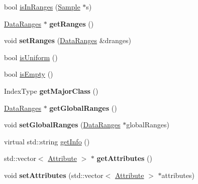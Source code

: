 \begin{DoxyCompactItemize}
\item 
bool \hyperlink{classffactory_1_1_partition_statistics_abfc82c4f58a2aac9e1e973f523eb518f}{is\-In\-Ranges} (\hyperlink{classffactory_1_1_sample}{Sample} $\ast$s)
\item 
\hypertarget{classffactory_1_1_partition_statistics_a6a55fa5cd07f699548228fa2fc8e4145}{\hyperlink{classffactory_1_1_data_ranges}{Data\-Ranges} $\ast$ {\bfseries get\-Ranges} ()}\label{classffactory_1_1_partition_statistics_a6a55fa5cd07f699548228fa2fc8e4145}

\item 
\hypertarget{classffactory_1_1_partition_statistics_ade813f7891be11a26099ee3a3f43226c}{void {\bfseries set\-Ranges} (\hyperlink{classffactory_1_1_data_ranges}{Data\-Ranges} \&dranges)}\label{classffactory_1_1_partition_statistics_ade813f7891be11a26099ee3a3f43226c}

\item 
bool \hyperlink{classffactory_1_1_partition_statistics_aa927287d8be8aff9837578c5a06c770b}{is\-Uniform} ()
\item 
bool \hyperlink{classffactory_1_1_partition_statistics_a4ec7df5caa2f742cde745d89aa8ccec6}{is\-Empty} ()
\item 
\hypertarget{classffactory_1_1_partition_statistics_a96e49d994399370182a3482183466a1f}{Index\-Type {\bfseries get\-Major\-Class} ()}\label{classffactory_1_1_partition_statistics_a96e49d994399370182a3482183466a1f}

\item 
\hypertarget{classffactory_1_1_partition_statistics_a8b6fdc3ff4f64114922278ac8db8da39}{\hyperlink{classffactory_1_1_data_ranges}{Data\-Ranges} $\ast$ {\bfseries get\-Global\-Ranges} ()}\label{classffactory_1_1_partition_statistics_a8b6fdc3ff4f64114922278ac8db8da39}

\item 
\hypertarget{classffactory_1_1_partition_statistics_a9d1f36a35f75db82e26043569e47b8e9}{void {\bfseries set\-Global\-Ranges} (\hyperlink{classffactory_1_1_data_ranges}{Data\-Ranges} $\ast$global\-Ranges)}\label{classffactory_1_1_partition_statistics_a9d1f36a35f75db82e26043569e47b8e9}

\item 
virtual std\-::string \hyperlink{classffactory_1_1_partition_statistics_a9a398b8dce4258794ebba89ef78f1978}{get\-Info} ()
\item 
\hypertarget{classffactory_1_1_partition_statistics_a74a0483397cf04ede026c060e84dd32c}{std\-::vector$<$ \hyperlink{classffactory_1_1_attribute}{Attribute} $>$ $\ast$ {\bfseries get\-Attributes} ()}\label{classffactory_1_1_partition_statistics_a74a0483397cf04ede026c060e84dd32c}

\item 
\hypertarget{classffactory_1_1_partition_statistics_a8d43214c3e6c91a45962423ad1dd2c37}{void {\bfseries set\-Attributes} (std\-::vector$<$ \hyperlink{classffactory_1_1_attribute}{Attribute} $>$ $\ast$attributes)}\label{classffactory_1_1_partition_statistics_a8d43214c3e6c91a45962423ad1dd2c37}

\end{DoxyCompactItemize}
